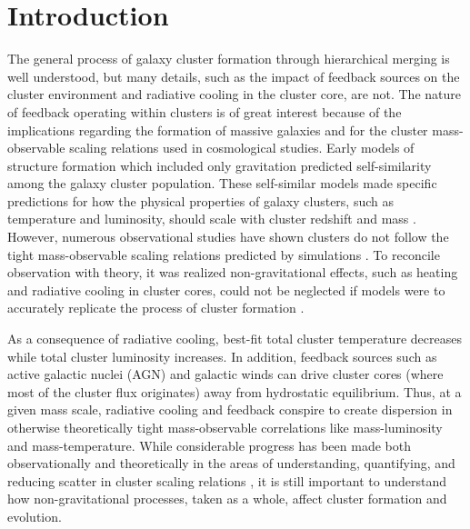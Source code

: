\documentclass[12pt,preprint]{aastex}
\begin{document}

\section{Introduction}
\label{sec:intro}

The general process of galaxy cluster formation through hierarchical
merging is well understood, but many details, such as the impact of
feedback sources on the cluster environment and radiative cooling in
the cluster core, are not. The nature of feedback operating within
clusters is of great interest because of the implications regarding
the formation of massive galaxies and for the cluster mass-observable
scaling relations used in cosmological studies. Early models of
structure formation which included only gravitation predicted
self-similarity among the galaxy cluster population. These
self-similar models made specific predictions for how the physical
properties of galaxy clusters, such as temperature and luminosity,
should scale with cluster redshift and mass \citep{kaiser86, kaiser91,
  1991ApJ...383...95E, nfw1, nfw2, 1996ApJ...469..494E,
  1997MNRAS.292..289E, 1997ApJ...480...36T, 1998ApJ...503..569E,
  1998ApJ...495...80B}. However, numerous observational studies have
shown clusters do not follow the tight mass-observable scaling
relations predicted by simulations \citep{edge91, 1998MNRAS.297L..57A,
  1998ApJ...504...27M, 1999MNRAS.305..631A, 1999ApJ...520...78H,
  2000ApJ...536...73N, 2001A&A...368..749F}. To reconcile observation
with theory, it was realized non-gravitational effects, such as
heating and radiative cooling in cluster cores, could not be neglected
if models were to accurately replicate the process of cluster
formation \citep[\eg][]{kaiser91, 1991ApJ...383...95E,
  2000ApJ...532...17L, voitbryan, 2002MNRAS.336..409B}.

As a consequence of radiative cooling, best-fit total cluster
temperature decreases while total cluster luminosity increases. In
addition, feedback sources such as active galactic nuclei (AGN) and
galactic winds can drive cluster cores (where most of the cluster flux
originates) away from hydrostatic equilibrium. Thus, at a given mass
scale, radiative cooling and feedback conspire to create dispersion in
otherwise theoretically tight mass-observable correlations like
mass-luminosity and mass-temperature. While considerable progress has
been made both observationally and theoretically in the areas of
understanding, quantifying, and reducing scatter in cluster scaling
relations \citep{1996ApJ...458...27B, 2005ApJ...624..606J, kravtsov06,
2006ApJ...639...64O, nagai07, VV08}, it is still important to
understand how non-gravitational processes, taken as a whole, affect
cluster formation and evolution.
\end{document}
